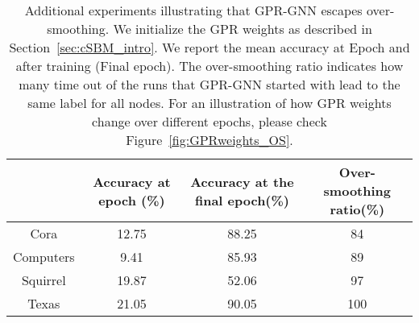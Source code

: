 \documentclass{article} \usepackage{iclr2021_conference,times}
\begin{document}
\begin{table}[ht]
\centering
\caption{Additional experiments illustrating that GPR-GNN escapes over-smoothing. We initialize the GPR weights  as described in Section~\ref{sec:cSBM_intro}. We report the mean accuracy at Epoch  and after training (Final epoch). The over-smoothing ratio indicates how many time out of the  runs that GPR-GNN started with lead to the same label for all nodes. For an illustration of how GPR weights change over different epochs, please check Figure~\ref{fig:GPRweights_OS}.}
\vspace{0.2cm}
\label{tab:OSexp}
\begin{tabular}{@{}cccc@{}}
\toprule
\multicolumn{1}{l}{} & Accuracy at epoch (\%) & Accuracy at the final epoch(\%) & Over-smoothing ratio(\%) \\ \midrule
Cora                 & 12.75      & 88.25          & 84                      \\
Computers            & 9.41       & 85.93          & 89                      \\
Squirrel             & 19.87      & 52.06          & 97                      \\
Texas                & 21.05      & 90.05          & 100                     \\ \bottomrule
\end{tabular}
\end{table}
\end{document}
